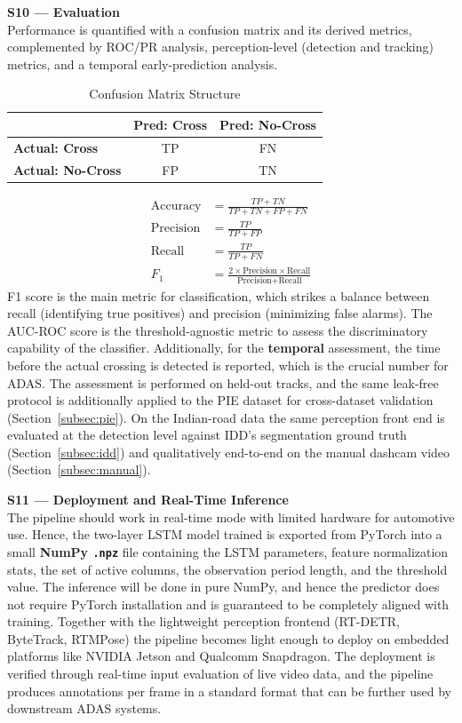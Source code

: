 \documentclass[conference]{IEEEtran}
\begin{document}
\textbf{S10 --- Evaluation} \\
Performance is quantified with a confusion matrix and its derived metrics, complemented by ROC/PR analysis, perception-level (detection and tracking) metrics, and a temporal early-prediction analysis.
\begin{table}[H]
    \centering
    \footnotesize
    \setlength{\tabcolsep}{4pt}
    \renewcommand{\arraystretch}{1.2}
    \caption{Confusion Matrix Structure}
    \label{tab:confusion_types}
    \begin{tabular}{|l|c|c|}
        \hline
        & \textbf{Pred: Cross} & \textbf{Pred: No-Cross} \\ \hline
        \textbf{Actual: Cross}    & TP & FN \\ \hline
        \textbf{Actual: No-Cross} & FP & TN \\ \hline
    \end{tabular}
\end{table}
\begin{align}
    \text{Accuracy} &= \frac{TP + TN}{TP + TN + FP + FN} \\[4pt]
    \text{Precision} &= \frac{TP}{TP + FP} \\[4pt]
    \text{Recall} &= \frac{TP}{TP + FN} \\[4pt]
    F_1 &= \frac{2 \times \text{Precision} \times \text{Recall}}{\text{Precision} + \text{Recall}}
\end{align}
F1 score is the main metric for classification, which strikes a balance between recall (identifying true positives) and precision (minimizing false alarms). The AUC-ROC score is the threshold-agnostic metric to assess the discriminatory capability of the classifier. Additionally, for the \textbf{temporal} assessment, the time before the actual crossing is detected is reported, which is the crucial number for ADAS. The assessment is performed on held-out tracks, and the same leak-free protocol is additionally applied to the PIE dataset for cross-dataset validation (Section~\ref{subsec:pie}). On the Indian-road data the same perception front end is evaluated at the detection level against IDD's segmentation ground truth (Section~\ref{subsec:idd}) and qualitatively end-to-end on the manual dashcam video (Section~\ref{subsec:manual}).

\textbf{S11 --- Deployment and Real-Time Inference} \\
The pipeline should work in real-time mode with limited hardware for automotive use. Hence, the two-layer LSTM model trained is exported from PyTorch into a small \textbf{NumPy \texttt{.npz}} file containing the LSTM parameters, feature normalization stats, the set of active columns, the observation period length, and the threshold value. The inference will be done in pure NumPy, and hence the predictor does not require PyTorch installation and is guaranteed to be completely aligned with training. Together with the lightweight perception frontend (RT-DETR, ByteTrack, RTMPose) the pipeline becomes light enough to deploy on embedded platforms like NVIDIA Jetson and Qualcomm Snapdragon. The deployment is verified through real-time input evaluation of live video data, and the pipeline produces annotations per frame in a standard format that can be further used by downstream ADAS systems.
\end{document}
